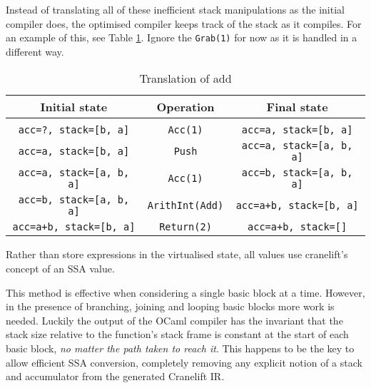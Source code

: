 Instead of translating all of these inefficient stack manipulations as the initial compiler does,
the optimised compiler keeps track of the stack as it compiles. For an example of this, see Table
\ref{table:stacktrans}. Ignore the \texttt{Grab(1)} for
now as it is handled in a different way.

\begin{table}[h]
      \centering
      \begin{tabular}{ccc}\toprule
            Initial state                   & Operation              & Final state
            \\
            \midrule
            \\
            \texttt{acc=?, stack=[b, a]}    & \texttt{Acc(1)}        & \texttt{acc=a, stack=[b, a]}
            \\
            \texttt{acc=a, stack=[b, a]}    & \texttt{Push}          & \texttt{acc=a, stack=[a, b,
                              a]}
            \\
            \texttt{acc=a, stack=[a, b, a]} & \texttt{Acc(1)}        & \texttt{acc=b, stack=[a, b,
                              a]}
            \\
            \texttt{acc=b, stack=[a, b, a]} & \texttt{ArithInt(Add)} & \texttt{acc=a+b, stack=[b,
                              a]}
            \\
            \texttt{acc=a+b, stack=[b, a]}  & \texttt{Return(2)}     & \texttt{acc=a+b, stack=[]}
            \\
            \bottomrule
      \end{tabular}

      \caption{Translation of add}
      \label{table:stacktrans}
\end{table}

Rather than store expressions in the virtualised state, all values use cranelift's concept of an
SSA value.

This method is effective when considering a single basic block at a time. However, in the presence
of branching, joining and looping basic blocks more work is needed. Luckily the output of the OCaml
compiler has the invariant that the stack size relative to the function's stack frame is constant
at the start of each basic block, \emph{no matter the path taken to reach it}. This happens to be
the key to allow efficient SSA conversion, completely removing any explicit notion of a stack and
accumulator from the generated Cranelift IR.

\label{opt-bb}

